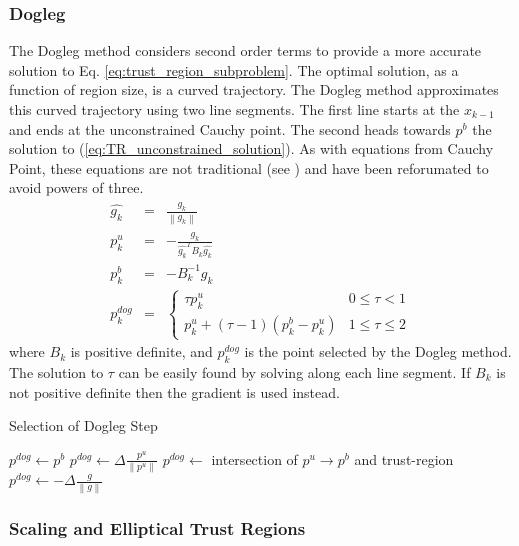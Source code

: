 \documentclass[peerreview,compsoc,onecolumn]{IEEEtran}
\newcommand{\norm}[1]{\left\lVert#1\right\rVert}
\begin{document}
\subsubsection{Dogleg}
\label{section:dogleg}  

The Dogleg method considers second order terms to provide a more accurate solution to Eq. \ref{eq:trust_region_subproblem}. The optimal solution, as a function of region size, is a curved trajectory. The Dogleg method approximates this curved trajectory using two line segments. The first line starts at the $x_{k-1}$ and ends at the unconstrained Cauchy point. The second heads towards $p^b$ the solution to (\ref{eq:TR_unconstrained_solution}). As with equations from Cauchy Point, these equations are not traditional (see \cite{numopt2006,IMM2004}) and have been reforumated to avoid powers of three.
\begin{eqnarray}
\hat{g_k} &=& \frac{g_k}{\norm{g_k}} \\
p^u_k &=& -\frac{g_k}{\hat{g_k}^T B_k \hat{g_k}} \\
p^b_k &=& -B^{-1}_k g_k \\
p^{dog}_k &=&
\begin{cases}
	\tau p^u_k & 0 \le \tau < 1 \\
	p^u_k + (\tau -1)(p^b_k-p^u_k) & 1 \le \tau \le 2
\end{cases}
\end{eqnarray}
where $B_k$ is positive definite, and $p^{dog}_k$ is the point selected by the Dogleg method. The solution to $\tau$ can be easily found by solving along each line segment. If $B_k$ is not positive definite then the gradient is used instead.

\begin{algorithm}{}
\caption{\label{alg:dogleg_step}Selection of Dogleg Step}
\begin{algorithmic}[1]
    \If{$\norm{p^b} < \Delta$} 
      \State $p^{dog} \gets p^b$
    \ElsIf{$\norm{p^u} \geq \Delta$} 
    \State $p^{dog} \gets \Delta \frac{p^u}{\norm{p^u}}$
    \Else
    \State $p^{dog} \gets $ intersection of $p^u \rightarrow p^b$ and trust-region
    \EndIf
  \Else
   \State $p^{dog} \gets -\Delta\frac{g}{\norm{g}}$ 
  \EndIf
\end{algorithmic}
\end{algorithm}

\subsubsection{Scaling and Elliptical Trust Regions} 
\label{section:scaling}
\end{document}
